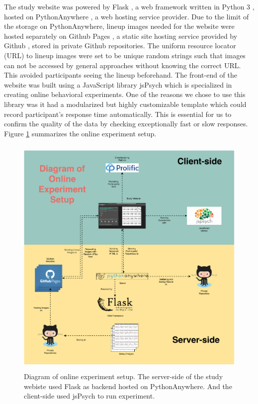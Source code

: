 \documentclass{monashthesis}
\theoremstyle{definition}
\theoremstyle{definition}
\theoremstyle{definition}
\theoremstyle{definition}
\theoremstyle{remark}
\begin{document}
The study website was powered by Flask \autocite{grinberg_flask_2018}, a web framework written in Python 3 \autocite{van_rossum_python_2009}, hosted on PythonAnywhere \autocite{pythonanywhere_pythonanywhere_2022}, a web hosting service provider. Due to the limit of the storage on PythonAnywhere, lineup images needed for the website were hosted separately on Github Pages \autocite{gtihub_github_2022-1}, a static site hosting service provided by Github \autocite{gtihub_github_2022}, stored in private Github repositories. The uniform resource locator (URL) to lineup images were set to be unique random strings such that images can not be accessed by general approaches without knowing the correct URL. This avoided participants seeing the lineup beforehand. The front-end of the website was built using a JavaScript \autocite{flanagan_javascript_2006} library jsPsych \autocite{de_leeuw_jspsych_2015} which is specialized in creating online behavioral experiments. One of the reasons we chose to use this library was it had a modularized but highly customizable template which could record participant's response time automatically. This is essential for us to confirm the quality of the data by checking exceptionally fast or slow responses. Figure \ref{fig:diagram-experiment} summarizes the online experiment setup.

\begin{figure}
\centering
\includegraphics[width=4.6875in,height=4.6875in]{figures/experiment_tech.pdf}
\caption{Diagram of online experiment setup. The server-side of the study webiste used Flask as backend hosted on PythonAnywhere. And the client-side used jsPsych to run experiment. \label{fig:diagram-experiment}}
\end{figure}
\end{document}
